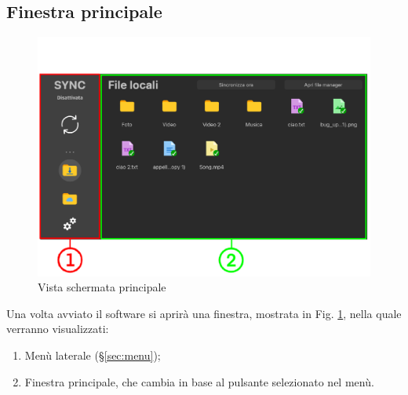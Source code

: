 \subsection{Finestra principale}
\label{sec:principale}
\begin{figure}[H]
    \centering
    \includegraphics[scale = 0.7]{components/img/Principale.png}
    \caption{Vista schermata principale}
    \label{fig:principale}
\end{figure}
Una volta avviato il software si aprirà una finestra,  mostrata in Fig. \ref{fig:principale}, nella quale verranno visualizzati:
\begin{enumerate}
\item Menù laterale (\S{}\ref{sec:menu});\
\item Finestra principale, che cambia in base al pulsante selezionato nel menù.\
\end{enumerate}


